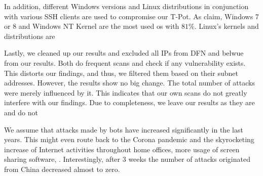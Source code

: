 In addition, different Windows versions and Linux distributions in conjunction with various SSH clients are used to compromise our T-Pot.
As \citet{Kelly2021} claim, Windows 7 or 8 and Windows NT Kernel are the most used \ac{os} with $81\%$.
Linux's kernels and distributions are 

Lastly, we cleaned up our results and excluded all IPs from DFN and \acs{belwue} from our results.
Both do frequent scans and check if any vulnerability exists.
This distorts our findings, and thus, we filtered them based on their subnet addresses.
However, the results show no big change.
The total number of attacks were merely influenced by it.
This indicates that our own scans do not greatly interfere with our findings. 
Due to completeness, we leave our results as they are and do not 

We assume that attacks made by bots have increased significantly in the last years.
This might even route back to the Corona pandemic and the skyrocketing increase of 
Internet activities throughout home offices, more usage of screen sharing software, .
Interestingly, after 3 weeks the number of attacks originated from China decreased almost to zero.


